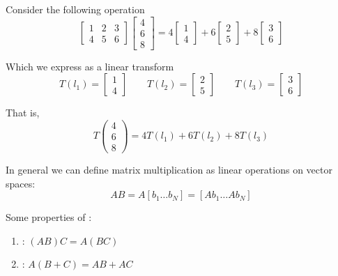 \documentclass{article}
\begin{document}
\begin{example}
  Consider the following operation
  \[
    \left[\begin{matrix}
        1 & 2 & 3 \\
        4 & 5 & 6
    \end{matrix}\right]
    \left[\begin{matrix}
        4 \\ 6 \\ 8
    \end{matrix}\right]
    =
    4 \left[\begin{matrix}
        1 \\
        4
    \end{matrix}\right]
    +
    6 \left[\begin{matrix}
        2 \\
        5
    \end{matrix}\right]
    +
    8 \left[\begin{matrix}
        3 \\
        6
    \end{matrix}\right]
  \]

  Which we express as a linear transform
  \[
    T(l_1) = \left[\begin{matrix}
        1 \\
        4
    \end{matrix}\right]
    \quad\quad
    T(l_2) =  \left[\begin{matrix}
        2 \\
        5
    \end{matrix}\right]
    \quad\quad
    T(l_3) = \left[\begin{matrix}
        3 \\
        6
    \end{matrix}\right]
  \]

  That is,
  \[
    T\left(\begin{matrix}
    4 \\ 6 \\ 8
    \end{matrix}\right)
    =
    4 T(l_1)
    + 6 T(l_2)
    + 8 T(l_3)
  \]
\end{example}

In general we can define matrix multiplication as linear operations on vector spaces:
\[
  A B = A [b_1 \ldots b_N] = \left[A b_1 \ldots Ab_N\right]
\]

Some properties of :
\begin{enumerate}
  \item {}: $(AB)C = A(BC)$
  \item {}: $A(B + C) = AB + AC$
\end{enumerate}
\end{document}
